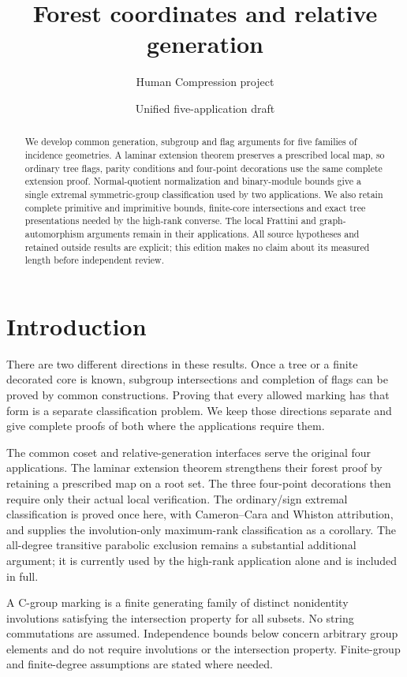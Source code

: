 
\title{Forest coordinates and relative generation}
\author{Human Compression project}\date{Unified five-application draft}
\maketitle
\begin{abstract}
We develop common generation, subgroup and flag arguments for five
families of incidence geometries. A laminar extension theorem preserves
a prescribed local map, so ordinary tree flags, parity conditions and
four-point decorations use the same complete extension proof.
Normal-quotient normalization and binary-module bounds give a single
extremal symmetric-group classification used by two applications.
We also retain complete primitive and imprimitive bounds, finite-core
intersections and exact tree presentations needed by the high-rank
converse. The local Frattini and graph-automorphism arguments remain
in their applications. All source hypotheses and retained outside
results are explicit; this edition makes no claim about its measured
length before independent review.
\end{abstract}
\section{Introduction}
There are two different directions in these results. Once a tree or a
finite decorated core is known, subgroup intersections and completion
of flags can be proved by common constructions. Proving that every
allowed marking has that form is a separate classification problem.
We keep those directions separate and give complete proofs of both
where the applications require them.

The common coset and relative-generation interfaces serve the original
four applications. The laminar extension theorem strengthens their
forest proof by retaining a prescribed map on a root set. The three
four-point decorations then require only their actual local verification.
The ordinary/sign extremal classification is proved once here, with
Cameron--Cara and Whiston attribution, and supplies the involution-only
maximum-rank classification as a corollary. The all-degree transitive
parabolic exclusion remains a substantial additional argument; it is
currently used by the high-rank application alone and is included in full.

A C-group marking is a finite generating family of distinct nonidentity
involutions satisfying the intersection property for all subsets.
No string commutations are assumed. Independence bounds below concern
arbitrary group elements and do not require involutions or the
intersection property. Finite-group and finite-degree assumptions
are stated where needed.









